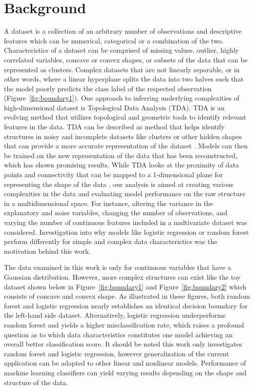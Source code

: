 \documentclass{llncs}
\begin{document}
\section{Background}
\noindent 

A dataset is a collection of an arbitrary number of observations and descriptive features which can be numerical, categorical or a combination of the two. Characteristics of a dataset can be comprised of missing values, outlier, highly correlated variables, concave or convex shapes, or subsets of the data that can be represented as clusters. Complex datasets that are not linearly separable, or in other words, where a linear hyperplane splits the data into two halves such that the model poorly predicts the class label of the respected observation (Figure~\ref{fig:boundary1}). One approach to inferring underlying complexities of high-dimensional dataset is Topological Data Analysis (TDA). TDA is an evolving method that utilizes topological and geometric tools to identify relevant features in the data. TDA can be described as method that helps identify structures in noisy and incomplete datasets like clusters or other hidden shapes that can provide a more accurate representation of the dataset \cite{chazal}. Models can then be trained on the new representation of the data that has been reconstructed, which has shown promising results. While TDA looks at the proximity of data points and connectivity that can be mapped to a 1-dimensional plane for representing the shape of the data \cite{munch}, our analysis is aimed at creating various complexities in the data and evaluating model performance on the raw structure in a multidimensional space. For instance, altering the variance in the explanatory and noise variables, changing the number of observations, and varying the number of continuous features included in a multivariate dataset was considered. Investigation into why models like logistic regression or random forest perform differently for simple and complex data characteristics was the motivation behind this work.

\noindent 
The data examined in this work is only for continuous variables that have a Gaussian distribution. However, more complex structures can exist like the toy dataset shown below in Figure~\ref{fig:boundary1} and Figure~\ref{fig:boundary2} which consists of concave and convex shape. As illustrated in these figures, both random forest and logistic regression nearly establishes an identical decision boundary for the left-hand side dataset. Alternatively, logistic regression underperforms random forest and yields a higher misclassification rate, which raises a profound question as to which data characteristics constitutes one model achieving an overall better classification score. It should be noted this work only investigates random forest and logistic regression, however generalization of the current application can be adapted to other linear and nonlinear models. Performance of machine learning classifiers can yield varying results depending on the shape and structure of the data.
\end{document}
